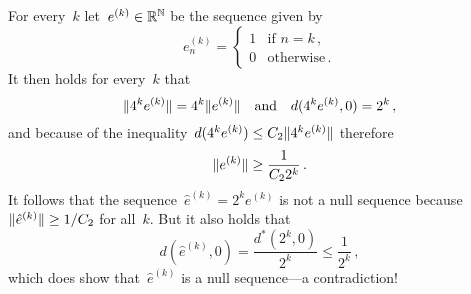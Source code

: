 \addtocounter{subsection}{2}
\subsection{}

For every~$k$ let~$e^{(k)} \in \mathbb{R}^{\mathbb{N}}$ be the sequence given by
\[
    e^{(k)}_n
  = \begin{cases}
      1 & \text{if~$n = k$} \,, \\
      0 & \text{otherwise}  \,.
    \end{cases}
\]
It then holds for every~$k$ that
\[
    \lVert 4^k e^{(k)} \rVert
  = 4^k \lVert e^{(k)} \rVert
  \quad\text{and}\quad
    d( 4^k e^{(k)}, 0 )
  = 2^k \,,
\]
and because of the inequality~$d( 4^k e^{(k)} ) \leq C_2 \lVert 4^k e^{(k)} \rVert$ therefore
\[
        \lVert e^{(k)} \rVert
  \geq  \frac{1}{C_2 2^k} \,.
\]
It follows that the sequence~$\hat{e}^{(k)} = 2^k e^{(k)}$ is not a null sequence because~$\lVert \hat{e}^{(k)} \rVert \geq 1/C_2$ for all~$k$.
But it also holds that
\[
        d( \hat{e}^{(k)}, 0)
  =     \frac{d^*(2^k, 0)}{2^k}
  \leq  \frac{1}{2^k} \,,
\]
which does show that~$\hat{e}^{(k)}$ is a null sequence---a contradiction!




